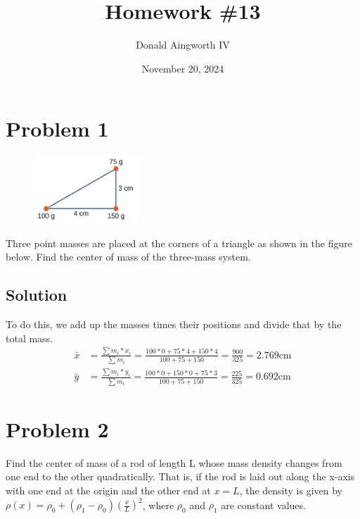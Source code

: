\documentclass[12pt]{article}
\title{Homework \#13}
\author{Donald Aingworth IV}
\date{November 20, 2024}
\begin{document}

\maketitle

\pagebreak

\section*{Problem 1}
\begin{figure}
    \vspace{-30pt}
    \includegraphics[width=0.35\textwidth]{graph_1.png} 
\end{figure}
Three point masses are placed at the corners of a triangle as shown in the figure below. Find the
center of mass of the three-mass system.

\subsection*{Solution}
To do this, we add up the masses times their positions and divide that by the total mass.
\begin{align}
    \bar{x} &=  \frac{\sum m_i*x_i}{\sum m_i}
        =   \frac{100*0 + 75*4 + 150*4}{100 + 75 + 150}
        =   \frac{900}{325}
        =   \boxed{2.769 \unit{\centi\meter}}\\
    \bar{y} &=  \frac{\sum m_i*y_i}{\sum m_i}
        =   \frac{100*0 + 150*0 + 75*3}{100 + 75 + 150}
        =   \frac{225}{325}
        =   \boxed{0.692\unit{\centi\meter}}
\end{align}

\pagebreak
\section*{Problem 2}
Find the center of mass of a rod of length L whose mass density changes from one end to the other
quadratically. That is, if the rod is laid out along the x-axis with one end at the origin and the other end
at $x = L$, the density is given by $\rho(x) = \rho_0 + (\rho_1 - \rho_0) \left(\frac{x}{L}\right)^2$, where $\rho_0$ and $\rho_1$ are constant values.
\end{document}
